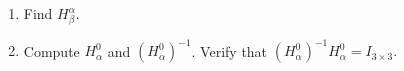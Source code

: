 \documentclass{16384_doc}
\begin{document}
\begin{questions}
\begin{enumerate}[label=\alph*.]
\begin{enumerate} [label=(\roman*)]
          \item $q^\beta = \begin{bmatrix} 1 \\ 0 \end{bmatrix}$
          
           \item $v^\beta = \begin{bmatrix} 0 \\ 1 \end{bmatrix}$
          	
           \item $u^\beta = \begin{bmatrix} 1 \\ 1 \end{bmatrix}$
          	
        \end{enumerate}
        \noindent Ensure that the coordinates make sense in the
        new representation.

        \begin{tcolorbox}[height=3cm]
        \end{tcolorbox}

        \item \text{[1 point]} 
        Find $H_\beta^\alpha$. %

        \begin{tcolorbox}[height=3cm]
        \end{tcolorbox}


        \item \text{[2 points]} 
        Compute $H_\alpha^0$ and $(H_\alpha^0)^{-1}$.
        Verify that
        $(H_\alpha^0)^{-1} H_\alpha^0 = I_{3\times3}.$

        \begin{tcolorbox}[height=3cm]
        \end{tcolorbox}


\end{enumerate}
\end{questions}
\end{document}
